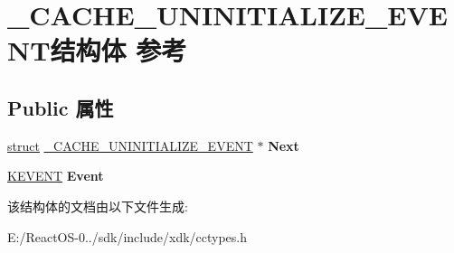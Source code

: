 \hypertarget{struct___c_a_c_h_e___u_n_i_n_i_t_i_a_l_i_z_e___e_v_e_n_t}{}\section{\+\_\+\+C\+A\+C\+H\+E\+\_\+\+U\+N\+I\+N\+I\+T\+I\+A\+L\+I\+Z\+E\+\_\+\+E\+V\+E\+N\+T结构体 参考}
\label{struct___c_a_c_h_e___u_n_i_n_i_t_i_a_l_i_z_e___e_v_e_n_t}
\subsection*{Public 属性}
\begin{DoxyCompactItemize}
\item 
\mbox{\label{struct___c_a_c_h_e___u_n_i_n_i_t_i_a_l_i_z_e___e_v_e_n_t_aa8f5859be48a4b4ea663d6aec8e8e5fc}} 
\hyperlink{interfacestruct}{struct} \hyperlink{struct___c_a_c_h_e___u_n_i_n_i_t_i_a_l_i_z_e___e_v_e_n_t}{\+\_\+\+C\+A\+C\+H\+E\+\_\+\+U\+N\+I\+N\+I\+T\+I\+A\+L\+I\+Z\+E\+\_\+\+E\+V\+E\+NT} $\ast$ {\bfseries Next}
\item 
\mbox{\label{struct___c_a_c_h_e___u_n_i_n_i_t_i_a_l_i_z_e___e_v_e_n_t_a56b54fa2a5d4c229d89a7f77c63534cb}} 
\hyperlink{struct___k_e_v_e_n_t}{K\+E\+V\+E\+NT} {\bfseries Event}
\end{DoxyCompactItemize}


该结构体的文档由以下文件生成\+:\begin{DoxyCompactItemize}
\item 
E\+:/\+React\+O\+S-\/0../sdk/include/xdk/cctypes.\+h\end{DoxyCompactItemize}
